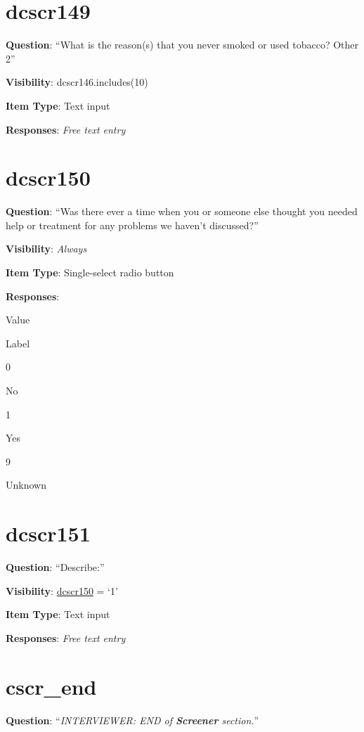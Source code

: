 \documentclass[]{book}
\begin{document}
\hypertarget{dcscr149}{%
\section{dcscr149}\label{dcscr149}}

\textbf{Question}: ``What is the reason(s) that you never smoked or used tobacco? Other 2''

\textbf{Visibility}: dcscr146.includes(10)

\textbf{Item Type}: Text input

\textbf{Responses}: \emph{Free text entry}

\hypertarget{dcscr150}{%
\section{dcscr150}\label{dcscr150}}

\textbf{Question}: ``Was there ever a time when you or someone else thought you needed help or treatment for any problems we haven't discussed?''

\textbf{Visibility}: \emph{Always}

\textbf{Item Type}: Single-select radio button

\textbf{Responses}:

Value

Label

0

No

1

Yes

9

Unknown

\hypertarget{dcscr151}{%
\section{dcscr151}\label{dcscr151}}

\textbf{Question}: ``Describe:''

\textbf{Visibility}: \protect\hyperlink{dcscr150}{dcscr150} = `1'

\textbf{Item Type}: Text input

\textbf{Responses}: \emph{Free text entry}

\hypertarget{cscr_end}{%
\section{cscr\_end}\label{cscr_end}}

\textbf{Question}: ``\emph{INTERVIEWER: END of \textbf{Screener} section.}''
\end{document}
